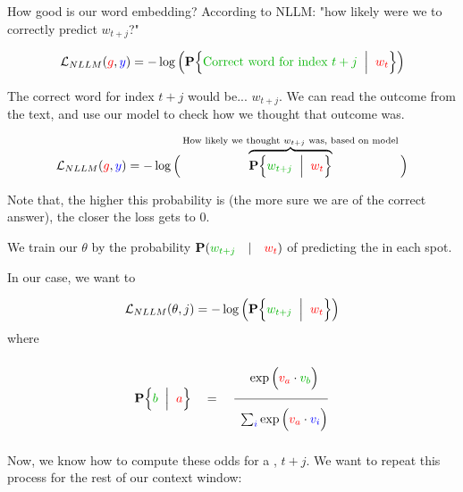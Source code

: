         How good is our word embedding? According to NLLM: "how likely were we to correctly predict $w_{t+j}$?"

        \begin{equation*}
            \loss_{NLLM}(\red{g},\blu{y}) = -\log \Big(
                \given{\text{\grn{Correct word for index $t+j$}}}{\red{w_t}} 
            \Big) 
        \end{equation*}

        The correct word for index $t+j$ would be... $w_{t+j}$. We can read the outcome from the text, and use our model to check how  we thought that outcome was.

        \begin{equation*}
            \loss_{NLLM}(\red{g},\blu{y}) = -\log \Big(
                \overbrace{
                \given{\grn{w_{t+j}}}{\red{w_t}} 
                }^{\text{How likely we thought $w_{t+j}$ was, based on model}}
            \Big) 
        \end{equation*}

        Note that, the higher this probability is (the more sure we are of the correct answer), the closer the loss gets to 0.\\

        \begin{kequation}
            We train our  $\theta$ by  the probability $\mathbf{P}(\grn{w_{t+j}} \quad|\quad \red{w_t})$ of predicting the  in each spot.

            In our case, we want to 

            \begin{equation*}
                \loss_{NLLM}(\theta,j) = -\log \Big(
                    \given{\grn{w_{t+j}}}{\red{w_t}} 
                \Big) 
            \end{equation*}
            where

            \begin{equation*}
                \given{ \grn{b} }{ \red{a} } 
                \quad=\quad
                \frac{  \phantom{ \Bigg|} 
                \exp \Big(\red{v_a} \cdot \grn{v_b}\Big) }
                {\phantom{ \Bigg|}
                \sum_{\blu{i}} \exp \Big(\red{v_a} \cdot \blu{v_i} \Big) }
            \end{equation*}
        \end{kequation}

        Now, we know how to compute these odds for a , $t+j$. We want to repeat this process for the rest of our context window:


